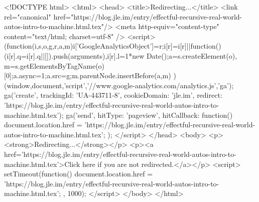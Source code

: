 <!DOCTYPE html>
<html>
<head>
<title>Redirecting...</title>
<link rel="canonical" href="https://blog.jle.im/entry/effectful-recursive-real-world-autos-intro-to-machine.html.tex"/>
<meta http-equiv="content-type" content="text/html; charset=utf-8" />
<script>
(function(i,s,o,g,r,a,m){i['GoogleAnalyticsObject']=r;i[r]=i[r]||function(){
(i[r].q=i[r].q||[]).push(arguments)},i[r].l=1*new Date();a=s.createElement(o),
m=s.getElementsByTagName(o)[0];a.async=1;a.src=g;m.parentNode.insertBefore(a,m)
})(window,document,'script','//www.google-analytics.com/analytics.js','ga');
ga('create', { trackingId: 'UA-443711-8', cookieDomain: 'jle.im', redirect: 'https://blog.jle.im/entry/effectful-recursive-real-world-autos-intro-to-machine.html.tex'});
ga('send', { hitType: 'pageview', hitCallback: function() { document.location.href = 'https://blog.jle.im/entry/effectful-recursive-real-world-autos-intro-to-machine.html.tex'; } });
</script>
</head>
<body>
  <p><strong>Redirecting...</strong></p>
  <p><a href='https://blog.jle.im/entry/effectful-recursive-real-world-autos-intro-to-machine.html.tex'>Click here if you are not redirected.</a></p>
  <script>
    setTimeout(function() { document.location.href = 'https://blog.jle.im/entry/effectful-recursive-real-world-autos-intro-to-machine.html.tex'; }, 1000);
  </script>
</body>
</html>
